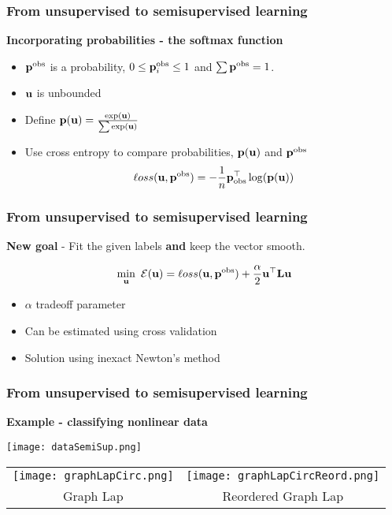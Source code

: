 \documentclass[12pt,fleqn]{beamer}
\begin{document}
\begin{frame}
\frametitle{From unsupervised to semisupervised learning }

{\bf Incorporating probabilities - the softmax function}

\begin{itemize}
\item ${\bf p}^{\rm obs}$ is a probability, $0 \le {\bf p}_i^{\rm obs} \le 1$ and $\sum {\bf p}^{\rm obs} = 1$.

\item ${\bf u}$ is unbounded 

\item Define ${\bf p}({\bf u}) = {\frac {\exp({\bf u})}{\sum \exp({\bf u})}}$

\item Use cross entropy to compare probabilities, ${\bf p}({\bf u})$ and ${\bf p}^{\rm obs}$
$$ {\ell oss}({\bf u},{\bf p}^{\rm obs}) = -{\frac 1n} {\bf p}_{\rm obs}^{\top} \log({\bf p}({\bf u})) $$

\end{itemize}

\end{frame}

\begin{frame}
\frametitle{From unsupervised to semisupervised learning }

{\bf New goal} - Fit the given labels {\bf and} keep the vector smooth.

$$ \min_{{\bf u}} \ {\cal E}({\bf u}) = {\ell oss}({\bf u},{\bf p}^{\rm obs}) + {\frac \alpha 2} {\bf u}^{\top} {\bf L} {\bf u} $$ 

\begin{itemize}
\item $\alpha$ tradeoff parameter
\item Can be estimated using cross validation
\item Solution using inexact Newton's method
\end{itemize}

\end{frame}


\begin{frame}
\frametitle{From unsupervised to semisupervised learning }

{\bf Example - classifying nonlinear data}

\begin{center}
\texttt{[image: dataSemiSup.png]} 
\begin{tabular}{cc}
\texttt{[image: graphLapCirc.png]} &
\texttt{[image: graphLapCircReord.png]} \\
Graph Lap &   Reordered Graph Lap 
\end{tabular}
\end{center}



\end{frame}
\end{document}
